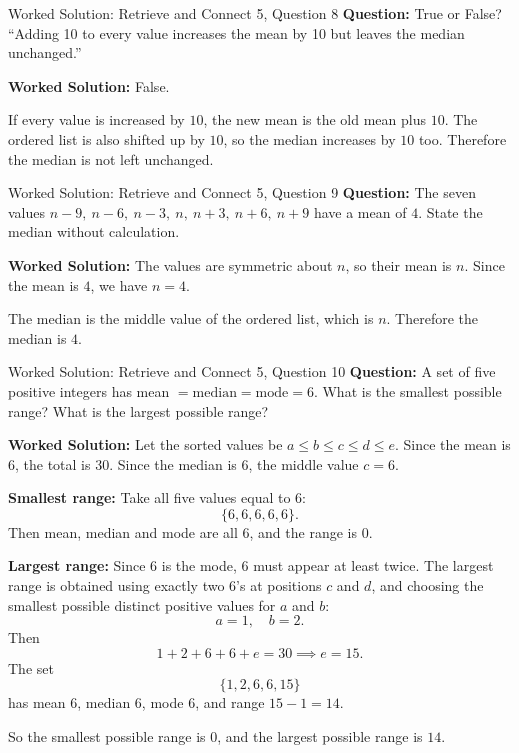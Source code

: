 \documentclass{beamer}
\begin{document}
\begin{frame}{Worked Solution: Retrieve and Connect 5, Question 8}
\small
\textbf{Question:} True or False? ``Adding 10 to every value increases the mean by 10 but leaves the median unchanged.''

\smallskip
\textbf{Worked Solution:} False.

If every value is increased by \(10\), the new mean is the old mean plus \(10\). The ordered list is also shifted up by \(10\), so the median increases by \(10\) too. Therefore the median is not left unchanged.
\end{frame}

\begin{frame}{Worked Solution: Retrieve and Connect 5, Question 9}
\small
\textbf{Question:} The seven values \(n-9,\ n-6,\ n-3,\ n,\ n+3,\ n+6,\ n+9\) have a mean of \(4\). State the median without calculation.

\smallskip
\textbf{Worked Solution:} The values are symmetric about \(n\), so their mean is \(n\). Since the mean is \(4\), we have \(n=4\).

The median is the middle value of the ordered list, which is \(n\). Therefore the median is \(4\).
\end{frame}

\begin{frame}{Worked Solution: Retrieve and Connect 5, Question 10}
\small
\textbf{Question:} A set of five positive integers has mean \(= \text{median} = \text{mode} = 6\). What is the smallest possible range? What is the largest possible range?

\smallskip
\textbf{Worked Solution:} Let the sorted values be \(a\le b\le c\le d\le e\). Since the mean is \(6\), the total is \(30\). Since the median is \(6\), the middle value \(c=6\).

\textbf{Smallest range:} Take all five values equal to \(6\):
\[
\{6,6,6,6,6\}.
\]
Then mean, median and mode are all \(6\), and the range is \(0\).

\textbf{Largest range:} Since \(6\) is the mode, \(6\) must appear at least twice. The largest range is obtained using exactly two \(6\)'s at positions \(c\) and \(d\), and choosing the smallest possible distinct positive values for \(a\) and \(b\):
\[
a=1,\quad b=2.
\]
Then
\[
1+2+6+6+e=30 \implies e=15.
\]
The set
\[
\{1,2,6,6,15\}
\]
has mean \(6\), median \(6\), mode \(6\), and range \(15-1=14\).

So the smallest possible range is \(0\), and the largest possible range is \(14\).
\end{frame}
\end{document}
